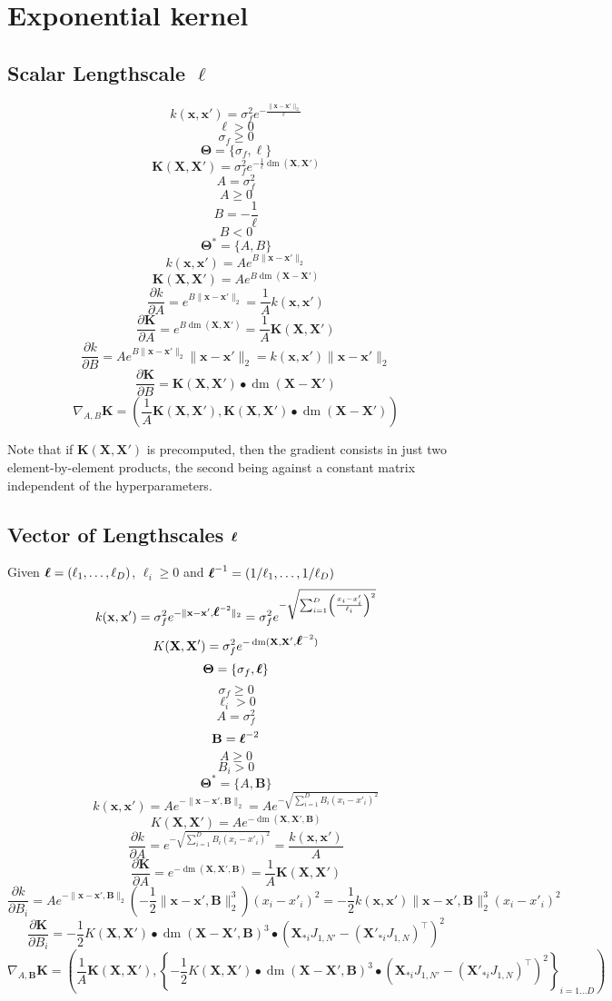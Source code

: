 \documentclass[a4paper,11pt]{article}
\newcommand\x{{\mathbf x}}
\newcommand\X{{\mathbf X}}
\newcommand\K{{\mathbf K}}
\newcommand\ELL{{\Ivec \ell}}
\DeclareMathOperator*{\dm}{dm}
\newcommand{\Ivec}[1]{\mbox{\boldmath $#1$}}
\begin{document}
\section{Exponential kernel}
\subsection{Scalar Lengthscale $\ell$}
$$k(\x,\x') = \sigma_f^2 e^{-\frac{\|\x-\x'\|_2}{\ell}}$$
$$\ell > 0$$
$$\sigma_f \ge 0$$
$$\mathbf{\Theta} = \{ \sigma_f, \ell \}$$
$$\K(\X,\X') = \sigma_f^2 e^{-\frac{1}{\ell}\dm(\X,\X')}$$
$$A = \sigma_f^2$$
$$A \ge 0$$
$$B = -\frac{1}{\ell}$$
$$B < 0$$
$$\mathbf{\Theta}^* = \{ A, B \}$$
$$k(\x,\x') = A e^{B\|\x-\x'\|_2}$$
$$\K(\X,\X') = A e^{B \dm(\X-\X')}$$
$$\frac{\partial k}{\partial A} = e^{B\|\x-\x'\|_2} = \frac{1}{A}k(\x,\x')$$
$$\frac{\partial \K}{\partial A} = e^{B \dm(\X,\X')} = \frac{1}{A} \K(\X,\X')$$
$$\frac{\partial k}{\partial B} = A e^{B\|\x-\x'\|_2} \|\x-\x'\|_2 =
k(\x,\x') \|\x-\x'\|_2$$
$$\frac{\partial \K}{\partial B} = \K(\X,\X') \bullet \dm(\X-\X')$$
$$\nabla_{A,B} \K = (\frac{1}{A} \K(\X,\X'), \K(\X,\X') \bullet \dm(\X-\X'))$$

Note that if $\K(\X,\X')$ is precomputed, then the gradient consists
in just two element-by-element products, the second being against a
constant matrix independent of the hyperparameters.

\subsection{Vector of Lengthscales $\Ivec{\ell}$}
Given $\Ivec{\ell} = (\ell_1,\ldots,\ell_D)$, $\ell_i \ge 0$ and
$\ELL^{-1} = (1/\ell_1,\ldots,1/\ell_D)$
$$k(\x,\x') = \sigma_f^2 e^{-\|\x-\x',\ELL^{-2}\|_2}= \sigma_f^2
  e^{-\sqrt{\sum_{i=1}^D \left(\frac{x_i - x'_i}{\ell_i}\right)^2}}$$
$$K(\X,\X') = \sigma_f^2 e^{-\dm(\X,\X',\ELL^{-2})}$$
$$\mathbf{\Theta} = \{ \sigma_f, \ELL\}$$
$$\sigma_f \ge 0$$
$$\ell_i > 0$$
$$A = \sigma_f^2$$
$$\mathbf{B} = \ELL^{-2}$$
$$A \ge 0$$
$$B_i > 0$$
$$\mathbf{\Theta}^* = \{ A, \mathbf{B}\}$$
$$k(\x,\x') = A e^{-\|\x-\x',\mathbf{B}\|_2} = A e^{-\sqrt{\sum_{i=1}^D
    B_i(x_i - x'_i)^2}}$$  
$$K(\X,\X') = A e^{-\dm(\X,\X',\mathbf{B})}$$
$$\frac{\partial k}{\partial A} = e^{-\sqrt{\sum_{i=1}^D B_i(x_i -
    x'_i)^2}} = \frac{k(\x,\x')}{A}$$
$$\frac{\partial \K}{\partial A} = e^{-\dm(\X,\X',\mathbf{B})} =
\frac{1}{A}\K(\X,\X')$$ 
$$\frac{\partial k}{\partial B_i} = A e^{-\|\x-\x',\mathbf{B}\|_2}
\left( -\frac{1}{2} \|\x-\x',\mathbf{B}\|_2^3 \right) (x_i - x'_i)^2 =
-\frac{1}{2} k(\x,\x') \|\x-\x',\mathbf{B}\|_2^3 (x_i - x'_i)^2 $$
$$\frac{\partial \K}{\partial B_i} = -\frac{1}{2} K(\X,\X')
\bullet \dm(\X-\X',\mathbf{B})^3 \bullet (\X_{*i}J_{1,N'}-
(\X'_{*i}J_{1,N})^{\top})^2$$
$$\nabla_{A,\mathbf{B}} \K = \left(\frac{1}{A}\K(\X,\X'), \left\{-\frac{1}{2}
    K(\X,\X') \bullet \dm(\X-\X',\mathbf{B})^3 \bullet
    (\X_{*i}J_{1,N'}- (\X'_{*i}J_{1,N})^{\top})^2 \right\}_{i=1 \ldots
    D} \right)$$
\end{document}
